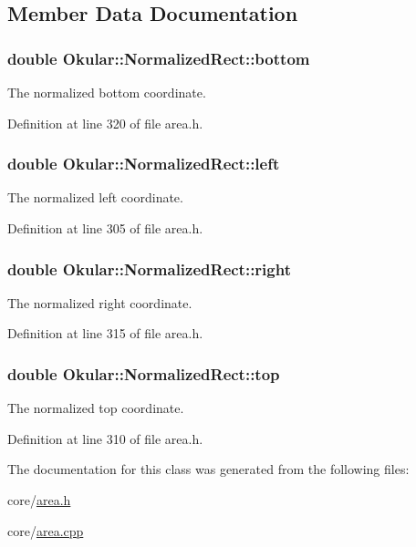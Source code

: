\subsection{Member Data Documentation}
\hypertarget{classOkular_1_1NormalizedRect_a06fddfff238371f6f584360c0678741a}{
\subsubsection[{bottom}]{\setlength{\rightskip}{0pt plus 5cm}double Okular\+::\+Normalized\+Rect\+::bottom}}\label{classOkular_1_1NormalizedRect_a06fddfff238371f6f584360c0678741a}
The normalized bottom coordinate. 

Definition at line 320 of file area.\+h.

\hypertarget{classOkular_1_1NormalizedRect_a76336fe9d733f2b559cf8df3ef48f9e7}{
\subsubsection[{left}]{\setlength{\rightskip}{0pt plus 5cm}double Okular\+::\+Normalized\+Rect\+::left}}\label{classOkular_1_1NormalizedRect_a76336fe9d733f2b559cf8df3ef48f9e7}
The normalized left coordinate. 

Definition at line 305 of file area.\+h.

\hypertarget{classOkular_1_1NormalizedRect_a12bbdbb865e6282c9a325b61638553f4}{
\subsubsection[{right}]{\setlength{\rightskip}{0pt plus 5cm}double Okular\+::\+Normalized\+Rect\+::right}}\label{classOkular_1_1NormalizedRect_a12bbdbb865e6282c9a325b61638553f4}
The normalized right coordinate. 

Definition at line 315 of file area.\+h.

\hypertarget{classOkular_1_1NormalizedRect_acfb70f6417c993508d50090b512cb954}{
\subsubsection[{top}]{\setlength{\rightskip}{0pt plus 5cm}double Okular\+::\+Normalized\+Rect\+::top}}\label{classOkular_1_1NormalizedRect_acfb70f6417c993508d50090b512cb954}
The normalized top coordinate. 

Definition at line 310 of file area.\+h.



The documentation for this class was generated from the following files\+:\begin{DoxyCompactItemize}
\item 
core/\hyperlink{area_8h}{area.\+h}\item 
core/\hyperlink{area_8cpp}{area.\+cpp}\end{DoxyCompactItemize}
